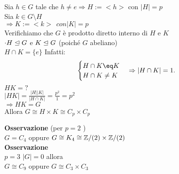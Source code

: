 \documentclass[12px]{article}
\begin{document}
{\begin{dimo}
		Sia $h\in G$ tale che $h\neq e \Rightarrow H:=<h>$ con $|H| = p$\\
		Sia  $k\in G\setminus H$\\
		 $ \Rightarrow K := <k> \ \ con |K|  = p$ \\
		 Verifichiamo che $G$ è prodotto diretto interno di $H$ e $K$\\
		  $\cdot H\trianglelefteq G$ e $K\trianglelefteq G$ (poiché $G$ abeliano)\\
		  $H\cap K = \{e\}$ Infatti:\\
		 \[\begin{cases}
			H\cap K \eq K\\
			H\cap K\neq K
		\end{cases} \Rightarrow |H\cap K| = 1.\]
		$HK = ?$\\
		$|HK| = \frac{|H||K|}{|H\cap K|} = \frac{p^2}1 = p^2$\\
		 $ \Rightarrow HK = G$ \\
		 Allora $G\cong H\times K\cong C_p\times C_p$
		
	\end{dimo} 
	\textbf{Osservazione} (per $p = 2$ )\\
	$G = C_4$ oppure $G\cong K_4 \cong \mathbb{Z}/(2)\times\mathbb{Z}/(2)$\\
	 \textbf{Osservazione}\\
	 $p = 3$ $|G| = 0$ allora\\
	  $G\cong C_9$ oppure $G\cong C_3\times C_3$\\

}
\end{document}
